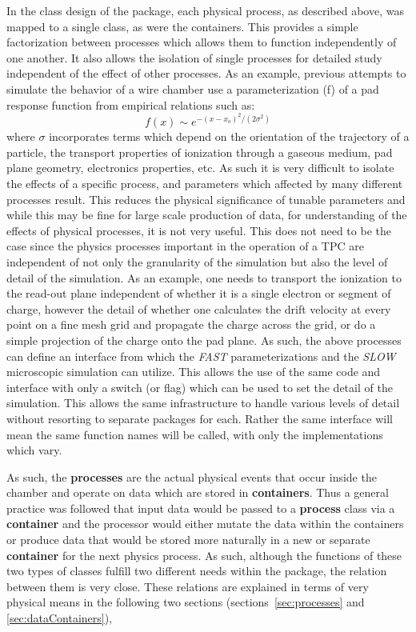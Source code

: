 \documentclass{article}
\begin{document}
In the class design of the package, each physical process, 
as described above, was mapped to a single class, as were the containers.
This provides a simple factorization 
between processes which allows them to function independently of
one another.  It also allows the isolation of single processes
for detailed study independent of the effect of other
processes.  As an example, previous attempts to simulate the
behavior of a wire chamber use a parameterization (f) of a 
pad response function from empirical relations such as:
\begin{equation}
f(x) \sim  e^{-(x-x_{o})^{2}/(2 \sigma^{2})}
\label{eq:alephPRF}
\end{equation}
where $\sigma$ incorporates terms which depend on the orientation of the
trajectory of a particle, the transport properties
of ionization through a gaseous medium, pad plane geometry, 
electronics properties, etc.  As such it is very difficult to isolate
the effects of a specific process, and parameters which affected
by many different processes result. This reduces the physical significance
of tunable parameters and while this may be fine for large scale production
of data, for understanding of the effects of physical processes, it is
not very useful.  This does not need to be the case since
the physics processes important in the operation of a TPC are
independent of not only the granularity of the simulation but also
the level of detail of the simulation.  As an example, one needs to
transport the ionization to the read-out plane independent of whether 
it is a single electron or segment of charge, however the detail of
whether one calculates the drift velocity at every point on a fine
mesh grid and propagate the charge across the grid, or do a simple
projection of the charge onto the pad plane.  As such, the above processes
can define an interface from which the {\em FAST}  parameterizations
and the {\em SLOW} microscopic simulation can utilize.  This allows
the use of the same code and interface with only a 
switch (or flag) which can be used to set the detail of
the simulation.  This allows the same infrastructure to handle
various levels of detail without resorting to separate packages for each.
Rather the same interface will mean the same function names
will be called, with only the implementations which vary.

As such, the {\bf processes} are the actual physical events that occur 
inside the chamber
and operate on data which are stored in {\bf containers}.  Thus a general
practice was followed that input data would be passed to a {\bf process} class
via a {\bf container} and the processor would either
mutate the data within the containers or produce data that would
be stored more naturally in a new or separate {\bf container} for the next
physics process.  As such, although the functions of these two types
of classes fulfill two different needs within the package, the relation
between them is very close.  These relations are explained in terms of
very physical means in the following two sections 
(sections~\ref{sec:processes} and \ref{sec:dataContainers}),
\end{document}
